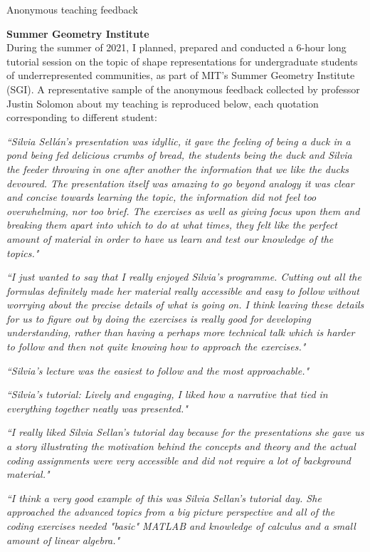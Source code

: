 \documentclass{resume} %
\begin{document}
\begin{rSection}{Anonymous teaching feedback}

{\bf  Summer Geometry Institute} \\
During the summer of 2021, I planned, prepared and conducted a 6-hour long tutorial session on the topic of shape representations for undergraduate students of underrepresented communities, as part of MIT's Summer Geometry Institute (SGI). A representative sample of the anonymous feedback collected by professor Justin Solomon about my teaching is reproduced below, each quotation corresponding to different student:

{\it ``Silvia Sellán's presentation was idyllic, it gave the feeling of being a duck in a pond being fed delicious crumbs of bread, the students being the duck and Silvia the feeder throwing in one after another the information that we like the ducks devoured. The presentation itself was amazing to go beyond analogy it was clear and concise towards learning the topic, the information did not feel too overwhelming, nor too brief.  The exercises as well as giving focus upon them and breaking them apart into which to do at what times, they felt like the perfect amount of material in order to have us learn and test our knowledge of the topics."}

{\it ``I just wanted to say that I really enjoyed Silvia's programme. Cutting out all the formulas definitely made her material really accessible and easy to follow without worrying about the precise details of what is going on. I think leaving these details for us to figure out by doing the exercises is really good for developing understanding, rather than having a perhaps more technical talk which is harder to follow and then not quite knowing how to approach the exercises."}

{\it ``Silvia's lecture was the easiest to follow and the most approachable."}

{\it ``Silvia's tutorial: Lively and engaging, I liked how a narrative that tied in everything together neatly was presented."}

{\it ``I really liked Silvia Sellan's tutorial day because for the presentations she gave us a story illustrating the motivation behind the concepts and theory and the actual coding assignments were very accessible and did not require a lot of background material."}

{\it ``I think a very good example of this was Silvia Sellan's tutorial day. She approached the advanced topics from a big picture perspective and all of the coding exercises needed "basic" MATLAB and knowledge of calculus and a small amount of linear algebra."}


\end{rSection}
\end{document}
